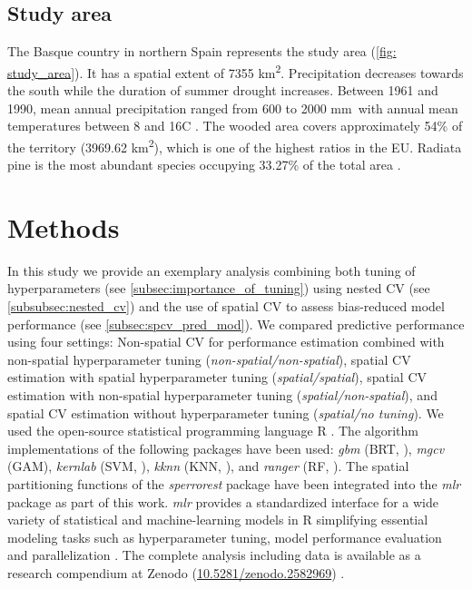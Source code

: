 \documentclass[review]{elsarticle}
\begin{document}
\subsection{Study area}

The Basque country in northern Spain represents the study area (\autoref{fig: study_area}).
It has a spatial extent of 7355 km\textsuperscript{2}.
Precipitation decreases towards the south while the duration of summer drought increases.
Between 1961 and 1990, mean annual precipitation ranged from 600 to 2000 mm\, with annual mean temperatures between 8 and 16\degree C \citep{Ganuza2003}.
The wooded area covers approximately 54\% of the territory (3969.62 km\textsuperscript{2}), which is one of the highest ratios in the EU.
Radiata pine is the most abundant species occupying 33.27\% of the total area \citep{Mugica2016}.

\section{Methods}

\noindent In this study we provide an exemplary analysis combining both tuning of hyperparameters (see \autoref{subsec:importance_of_tuning}) using nested \ac{CV} (see \autoref{subsubsec:nested_cv}) and the use of spatial \ac{CV} to assess bias-reduced model performance (see \autoref{subsec:spcv_pred_mod}).
We compared predictive performance using four settings: Non-spatial \ac{CV} for performance estimation combined with non-spatial hyperparameter tuning (\emph{non-spatial/non-spatial}), spatial \ac{CV} estimation with spatial hyperparameter tuning (\emph{spatial/spatial}), spatial \ac{CV} estimation with non-spatial hyperparameter tuning (\emph{spatial/non-spatial}), and spatial \ac{CV} estimation without hyperparameter tuning (\emph{spatial/no tuning}).
We used the open-source statistical programming language R \citep{R_core}.
The algorithm implementations of the following packages have been used: \textit{gbm} \citep{gbm} (\ac{BRT}, \cite{Elith2008}), \textit{mgcv} \citep{mgcv} (\ac{GAM}), \textit{kernlab} \citep{kernlab} (\ac{SVM}, \cite{Vapnik1998}), \textit{kknn} \citep{kknn} (\ac{KNN}, \cite{Dudani1976}), and \textit{ranger} \citep{ranger} (\ac{RF}, \cite{Breiman2001}).
The spatial partitioning functions of the \textit{sperrorest} package have been integrated into the \textit{mlr} package as part of this work.
\textit{mlr} provides a standardized interface for a wide variety of statistical and machine-learning models in R simplifying essential modeling tasks such as hyperparameter tuning, model performance evaluation and parallelization \citep{bischlMlrMachineLearning2016}.
The complete analysis including data is available as a research compendium at Zenodo (\url{10.5281/zenodo.2582969})  \citep{schratz_patrick_2019_2591746}.
\end{document}
